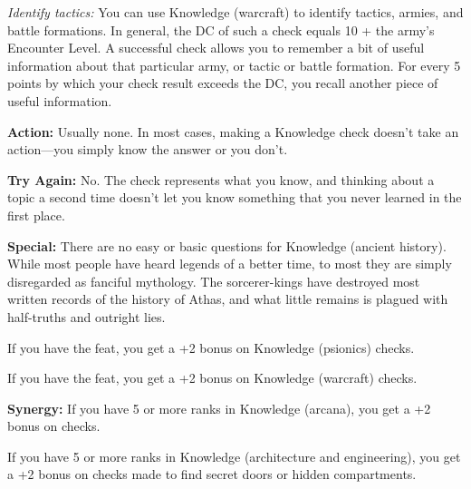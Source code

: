 \textit{Identify tactics:} You can use Knowledge (warcraft) to identify tactics, armies, and battle formations. In general, the DC of such a check equals 10 + the army's Encounter Level. A successful check allows you to remember a bit of useful information about that particular army, or tactic or battle formation. For every 5 points by which your check result exceeds the DC, you recall another piece of useful information.




\textbf{Action:} Usually none. %
In most cases, making a Knowledge check doesn't take an action---you simply know the answer or you don't.

\textbf{Try Again:} No. The check represents what you know, and thinking about a topic a second time doesn't let you know something that you never learned in the first place.

\textbf{Special:} There are no easy or basic questions for Knowledge (ancient history). While most people have heard legends of a better time, to most they are simply disregarded as fanciful mythology. The sorcerer-kings have destroyed most written records of the history of Athas, and what little remains is plagued with half-truths and outright lies.

If you have the  feat, you get a +2 bonus on Knowledge (psionics) checks.

If you have the  feat, you get a +2 bonus on Knowledge (warcraft) checks.

\textbf{Synergy:} If you have 5 or more ranks in Knowledge (arcana), you get a +2 bonus on  checks.

If you have 5 or more ranks in Knowledge (architecture and engineering), you get a +2 bonus on  checks made to find secret doors or hidden compartments.

